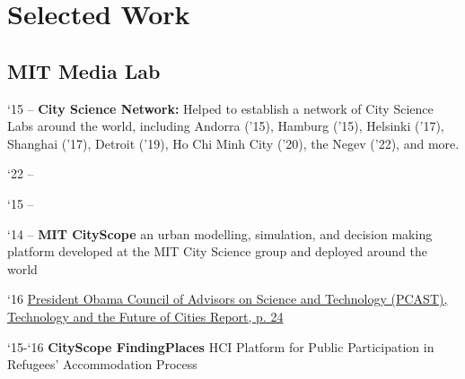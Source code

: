\section*{Selected Work}

\subsection*{MIT Media Lab}

\begin{tablist}

    \item[`15 --] \tab \textbf{City Science Network:} {Helped to establish a network of City Science Labs around the world, including Andorra ('15), Hamburg ('15), Helsinki ('17), Shanghai ('17), Detroit ('19), Ho Chi Minh City ('20), the Negev ('22), and more.}

    \begin{tablist}
        \item[`22 --] 
    \end{tablist}

    \begin{tablist}
        \item[`15 --] 
    \end{tablist}


    \item[`14 --] \tab \textbf{MIT CityScope} {an urban modelling, simulation, and decision making platform developed at the MIT City Science group and deployed around the world}

    \begin{tablist}
        \item[`16] \tab \href{https://obamawhitehouse.archives.gov/blog/2016/02/23/pcast-releases-technology-and-future-cities-report-president}{President Obama Council of Advisors on Science and Technology (PCAST), Technology and the Future of Cities Report, p. 24}
    \end{tablist}

    \item[`15-`16] \tab \textbf{CityScope FindingPlaces} {HCI Platform for Public Participation in Refugees' Accommodation Process}


\end{tablist}
